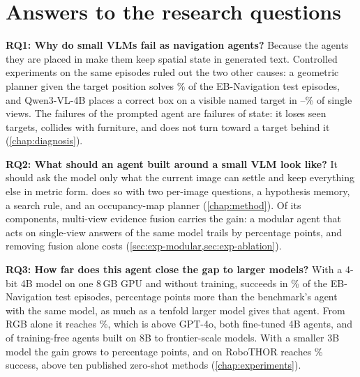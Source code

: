 \label{chap:conclusions}

\section{Answers to the research questions}
\noindent\textbf{RQ1: Why do small VLMs fail as navigation agents?} Because the agents they are placed in make them
keep spatial state in generated text. Controlled experiments on the same episodes ruled out the two other causes: a
geometric planner given the target position solves \nOracle\% of the EB-Navigation test episodes, and Qwen3-VL-4B
places a correct box on a visible named target in \nProbeThreeCommon--\nProbeThreeBase\% of single views. The
failures of the prompted agent are failures of state: it loses seen targets, collides with furniture, and does not
turn toward a target behind it (\cref{chap:diagnosis}).

\noindent\textbf{RQ2: What should an agent built around a small VLM look like?} It should ask the model only what
the current image can settle and keep everything else in metric form. \ours does so with two per-image questions, a
hypothesis memory, a search rule, and an occupancy-map planner (\cref{chap:method}). Of its components, multi-view
evidence fusion carries the gain: a modular agent that acts on single-view answers of the same model trails \ours by
\nSOverMod{} percentage points, and removing fusion alone costs \nAblFusionAbs{} (\cref{sec:exp-modular,sec:exp-ablation}).

\noindent\textbf{RQ3: How far does this agent close the gap to larger models?} With a 4-bit 4B model on one 8\,GB GPU
and without training, \ours succeeds in \nSThree\% of the EB-Navigation test episodes, \nGainThree{} percentage
points more than the benchmark's agent with the same model, as much as a tenfold larger model gives that agent. From RGB alone it reaches \nRGBThree\%, which is above
GPT-4o, both fine-tuned 4B agents, and \nNTrainFreeBelowRGB{} of \nNTrainFree{} training-free agents built on 8B to frontier-scale models. With a smaller
3B model the gain grows to \nGainTwo{} percentage points, and on RoboTHOR \ours reaches \nRoboSR\% success, above ten
published zero-shot methods (\cref{chap:experiments}).

